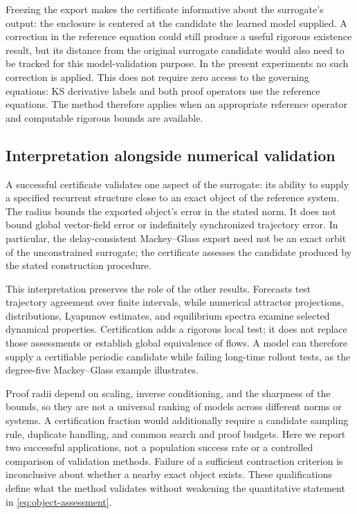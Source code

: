 \documentclass[11pt]{article}
\begin{document}
Freezing the export makes the certificate informative about the surrogate's
output: the enclosure is centered at the candidate the learned model supplied.
A correction in the reference equation could still produce a useful rigorous
existence result, but its distance from the original surrogate candidate would
also need to be tracked for this model-validation purpose. In the present
experiments no such correction is applied. This does not require zero access
to the governing equations: KS derivative labels and both proof operators use
the reference equations. The method therefore applies when an appropriate
reference operator and computable rigorous bounds are available.

\subsection{Interpretation alongside numerical validation}
A successful certificate validates one aspect of the surrogate: its ability
to supply a specified recurrent structure close to an exact object of the
reference system. The radius bounds the exported object's error in the stated
norm. It does not bound global vector-field error or indefinitely synchronized
trajectory error. In particular, the delay-consistent Mackey--Glass export
need not be an exact orbit of the unconstrained surrogate; the certificate
assesses the candidate produced by the stated construction procedure.

This interpretation preserves the role of the other results. Forecasts test
trajectory agreement over finite intervals, while numerical attractor
projections, distributions, Lyapunov estimates, and equilibrium spectra examine
selected dynamical properties. Certification adds a rigorous local test; it
does not replace those assessments or establish global equivalence of flows.
A model can therefore supply a certifiable periodic candidate while failing
long-time rollout tests, as the degree-five Mackey--Glass example illustrates.

Proof radii depend on scaling, inverse conditioning, and the sharpness of the
bounds, so they are not a universal ranking of models across different norms
or systems. A certification fraction would additionally require a candidate
sampling rule, duplicate handling, and common search and proof budgets. Here
we report two successful applications, not a population success rate or a
controlled comparison of validation methods. Failure of a sufficient
contraction criterion is inconclusive about whether a nearby exact object
exists. These qualifications define what the method validates without
weakening the quantitative statement in \eqref{eq:object-assessment}.
\end{document}
